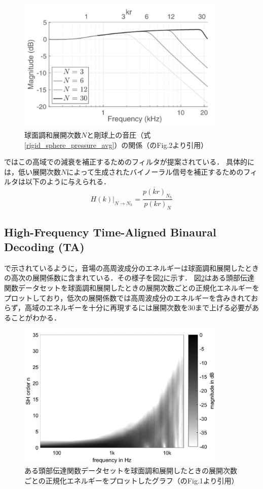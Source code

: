 \documentclass[a4paper]{jsarticle}
\begin{document}
\begin{figure}[htbp]
    \centering
    \includegraphics[clip,width=10cm]{./high_freq_rolloff.png}
    \caption{球面調和展開次数$N$と剛球上の音圧（式\ref{rigid_sphere_pressure_avg}）の関係（\cite{Ben-Hur2017-gm}のFig.2より引用）}
    \label{high_freq_rolloff}
\end{figure}

\cite{Sheaffer2014-bo}ではこの高域での減衰を補正するためのフィルタが提案されている．
具体的には，低い展開次数$N$によって生成されたバイノーラル信号を補正するためのフィルタは以下のように与えられる．
$$
    \left.H(k)\right|_{N \rightarrow N_{h}}=\frac{\overline{p(k r)}_{N_{h}}}{p(k r)_{N}}
$$

\subsection{High-Frequency Time-Aligned Binaural Decoding
    (TA)\cite{Schorkhuber2018-ql,Zaunschirm2018-mn}}
\cite{Zaunschirm2018-mn}で示されているように，音場の高周波成分のエネルギーは球面調和展開したときの高次の展開係数に含まれている．その様子を図\ref{high_order_energy}に示す．
図\ref{high_order_energy}はある頭部伝達関数データセットを球面調和展開したときの展開次数ごとの正規化エネルギーをプロットしており，低次の展開係数では高周波成分のエネルギーを含みきれておらず，高域のエネルギーを十分に再現するには展開次数を30まで上げる必要があることがわかる．

\begin{figure}[htbp]
    \centering
    \includegraphics[clip,width=10cm]{./high_order_energy.png}
    \caption{ある頭部伝達関数データセットを球面調和展開したときの展開次数ごとの正規化エネルギーをプロットしたグラフ（\cite{Zaunschirm2018-mn}のFig.1より引用）}
    \label{high_order_energy}
\end{figure}
\end{document}
